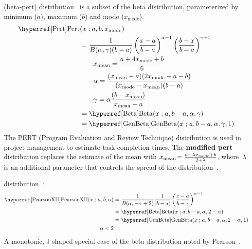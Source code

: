  (beta-pert) distribution~\cite{Clark1962, Vose2000} is a subset of the beta distribution, parameterized by minimum ($a$), maximum ($b$) and mode ($x_\text{mode}$).  
\begin{align}
\label{Pert}
\opr{Pert}&(x\given a,b,x_\text{mode}) \checked
\\ \notag
&=  
 \frac{1}{B(\alpha, \gamma) (b-a)}
\left(\frac{x-a}{b-a}\right)^{\alpha-1} \left(\frac{b-x}{b-a}\right)^{\gamma-1} \checked
\\ \notag & \qquad x_\text{mean} = \frac{a+4x_\text{mode}+b}{6} \checked
\\ & \qquad \alpha = \frac{(x_\text{mean}-a)(2 x_\text{mode} - a - b)}{(x_\text{mode}-x_\text{mean})(b-a)} \checked
\notag 
\\\notag  & \qquad \gamma = \alpha\frac{(b-x_\text{mean})}{x_\text{mean}-a} \checked
\\ & = \opr{Beta}(x\given a,b-a,\alpha,\gamma) \checked \notag
\\ & = \opr{GenBeta}(x\given  a,b-a,\alpha,\gamma, 1)  \checked \notag
\end{align}
The PERT (Program Evaluation and Review Technique) distribution is used in project management to estimate task completion times. The {\bf modified pert} distribution replaces the estimate of the mean with $x_\text{mean}\! = \frac{a+\lambda x_\text{mode}+b}{2+\lambda}$, where~$\lambda$ is an additional parameter that controls the spread of the distribution~\cite{Vose2000}.






 distribution~\cite{Pearson1916}: 
\begin{align}
\label{PearsonXII}
\opr{PearsonXII}(x\given a,b,\alpha) &=  \frac{1}{B(\alpha, -\alpha+2)} \frac{1}{|b-a|}\left( \frac{x-a}{b-x} \right)^{\alpha -1} 
\checked
\\ &= \opr{Beta}(x\given a,b-a ,\alpha, 2-\alpha) \notag  \checked
\\ &= \opr{GenBeta}(x\given a,b-a ,\alpha, 2-\alpha,1) \notag \checked
\\ \qquad \alpha<2 \notag
\end{align}
A monotonic, J-shaped special case of the beta distribution noted by Pearson~\cite{Pearson1916}.


